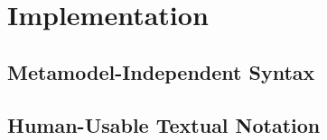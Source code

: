 
\chapter{Implementation}

\section{Metamodel-Independent Syntax}



\section{Human-Usable Textual Notation}


